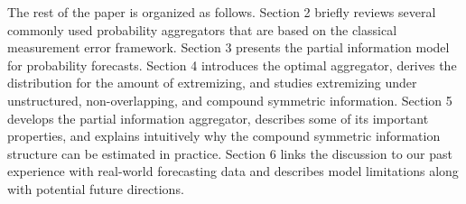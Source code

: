 \documentclass[11pt]{article}
\theoremstyle{definition}
\theoremstyle{definition}
\begin{document}







The rest of the paper is organized as follows. Section 2 briefly reviews several commonly used probability aggregators that are based on the classical measurement error framework. Section 3 presents the partial information model for probability forecasts. Section 4 introduces the optimal aggregator, derives the distribution for the amount of extremizing, and studies extremizing under unstructured, non-overlapping, and compound symmetric information. Section 5 develops the partial information aggregator, describes some of its important properties, and explains intuitively why the compound symmetric information structure can be estimated in practice. Section 6 links the discussion to our past experience with real-world forecasting data and describes model limitations along with potential future directions. 
\end{document}
